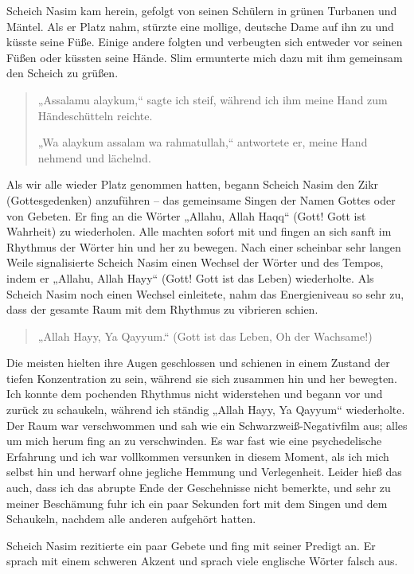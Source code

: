 \documentclass[12pt]{memoir}
\begin{document}
Scheich Nasim kam herein,
gefolgt von seinen Schülern in grünen Turbanen und Mäntel.
Als er Platz nahm, stürzte eine mollige,
deutsche Dame auf ihn zu und küsste seine Füße.
Einige andere folgten und verbeugten sich entweder vor seinen Füßen
oder küssten seine Hände.
Slim ermunterte mich dazu mit ihm gemeinsam den Scheich zu grüßen.

\begin{quote}
„Assalamu alaykum,“ sagte ich steif,
während ich ihm meine Hand zum Händeschütteln reichte.

„Wa alaykum assalam wa rahmatullah,“ antwortete er,
meine Hand nehmend und lächelnd.
\end{quote}

Als wir alle wieder Platz genommen hatten,
begann Scheich Nasim den Zikr (Gottesgedenken) anzuführen –
das gemeinsame Singen der Namen Gottes oder von Gebeten.
Er fing an die Wörter „Allahu, Allah Haqq“
(Gott! Gott ist Wahrheit) zu wiederholen.
Alle machten sofort mit und fingen an
sich sanft im Rhythmus der Wörter hin und her zu bewegen.
Nach einer scheinbar sehr langen Weile signalisierte Scheich Nasim
einen Wechsel der Wörter und des Tempos,
indem er „Allahu, Allah Hayy“ (Gott! Gott ist das Leben) wiederholte.
Als Scheich Nasim noch einen Wechsel einleitete,
nahm das Energieniveau so sehr zu,
dass der gesamte Raum mit dem Rhythmus zu vibrieren schien.

\begin{quote}
„Allah Hayy, Ya Qayyum.“ (Gott ist das Leben, Oh der Wachsame!)
\end{quote}

Die meisten hielten ihre Augen geschlossen
und schienen in einem Zustand der tiefen Konzentration zu sein,
während sie sich zusammen hin und her bewegten.
Ich konnte dem pochenden Rhythmus nicht widerstehen
und begann vor und zurück zu schaukeln,
während ich ständig „Allah Hayy, Ya Qayyum“ wiederholte.
Der Raum war verschwommen und sah wie ein Schwarzweiß-Negativfilm aus;
alles um mich herum fing an zu verschwinden.
Es war fast wie eine psychedelische Erfahrung
und ich war vollkommen versunken in diesem Moment,
als ich mich selbst hin und herwarf ohne jegliche Hemmung und Verlegenheit.
Leider hieß das auch,
dass ich das abrupte Ende der Geschehnisse nicht bemerkte,
und sehr zu meiner Beschämung fuhr ich ein paar Sekunden fort
mit dem Singen und dem Schaukeln,
nachdem alle anderen aufgehört hatten.

Scheich Nasim rezitierte ein paar Gebete und fing mit seiner Predigt an.
Er sprach mit einem schweren Akzent
und sprach viele englische Wörter falsch aus.
\end{document}
